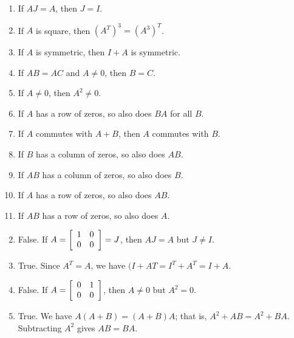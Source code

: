 \begin{multicols}{2}
\begin{ex}
\begin{enumerate}[label={\alph*.}]
\item If $AJ = A$, then $J = I$.

\item If $A$ is square, then $(A^{T})^{3} = (A^{3})^{T}$.

\item If $A$ is symmetric, then $I + A$ is symmetric.

\item If $AB = AC$ and $A \neq 0$, then $B = C$.

\item If $A \neq 0$, then $A^{2} \neq 0$.

\item If $A$ has a row of zeros, so also does $BA$ for all $B$.

\item If $A$ commutes with $A + B$, then $A$ commutes with $B$.

\item If $B$ has a column of zeros, so also does $AB$.

\item If $AB$ has a column of zeros, so also does $B$.

\item If $A$ has a row of zeros, so also does $AB$.

\item If $AB$ has a row of zeros, so also does $A$.

\end{enumerate}
\begin{sol}
\begin{enumerate}[label={\alph*.}]
\setcounter{enumi}{1}
\item  False. If $A = \left[ \begin{array}{rr}
1 & 0 \\
0 & 0
\end{array} \right] = J$, then $AJ = A$ but $J \neq I$.

\setcounter{enumi}{3}
\item  True. Since $A^{T} = A$, we have $(I + AT = I^{T} + A^{T} = I + A$.

\setcounter{enumi}{5}
\item  False. If $A = \left[ \begin{array}{rr}
0 & 1 \\
0 & 0
\end{array} \right]$, then $A \neq 0$ but $A^{2} = 0$.

\setcounter{enumi}{7}
\item  True. We have $A(A + B) = (A + B)A$; that is, $A^{2} + AB = A^{2} + BA$. Subtracting $A^{2}$ gives $AB = BA$.


\end{enumerate}
\end{sol}
\end{ex}
\end{multicols}
